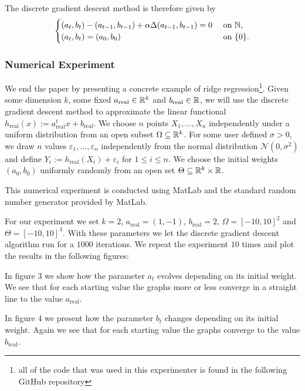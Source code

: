 The discrete gradient descent method is therefore given by
\begin{align*}
	\begin{cases}
		(a_t,b_t)-(a_{t-1},b_{t-1})
		+\alpha \Delta(a_{t-1},b_{t-1}) = 0 & \text{ on }\mathbb{N},\\
		(a_t,b_t)=(a_0,b_0) & \text{ on }\{0\}.
	\end{cases}
\end{align*}

\subsubsection{Numerical Experiment}
We end the paper by presenting a concrete example of ridge
regression\footnote{all of the code that
was used in this experimenter is found in the following
GitHub repository}. Given some dimension $ k $, some fixed $ a_{\mathrm{real}}\in\mathbb{R}^k $
and $ b_{\mathrm{real}}\in\mathbb{R} $, we will use the discrete gradient descent method to
approximate the linear functional
$ h_{\mathrm{real}}(x):=a_{\mathrm{real}}^t x +b_{\mathrm{real}}$.
We choose $ n $ points $ X_1,\ldots,X_n $ independently under
a uniform distribution from an open subset $ \Omega\subseteq\mathbb{R}^k $.
For some user defined $ \sigma>0 $, we draw $ n $
values $ \varepsilon_1,\ldots,\varepsilon_n $ independently 
from the normal distribution
$ \mathcal{N}(0,\sigma^2) $ and define $ Y_i:=h_{\mathrm{real}}(X_i)+\varepsilon_i $
for $ 1\leq i\leq n $. We choose the initial weights $ (a_0,b_0) $ uniformly
randomly from an open set $ \Theta\subseteq\mathbb{R}^k\times\mathbb{R} $.\medskip

This numerical experiment is conducted using MatLab
and the standard random number generator provided by MatLab.\medskip

For our experiment we set $ k=2 $, 
$a_{\mathrm{real}}=(1,-1)$, $ b_{\mathrm{real}}=2 $,
$ \Omega=[-10,10]^2 $ and $ \Theta=[-10,10]^3 $. 
With these parameters we let the discrete gradient descent
algorithm run for a $ 1000 $ iterations. We repeat the
experiment $ 10 $ times and plot the results in the
following figures:\smallskip 

In figure 3 %
we show how the parameter $ a_t $ evolves depending
on its initial weight. We
see that for each starting value the graphs 
more or less converge in a straight line to 
the value $ a_{\mathrm{real}} $. \smallskip

In figure 4 we
present how the parameter $ b_t $ changes depending
on its initial weight. Again we
see that for each starting value the graphs 
converge to the value $ b_{\mathrm{real}} $. \smallskip

